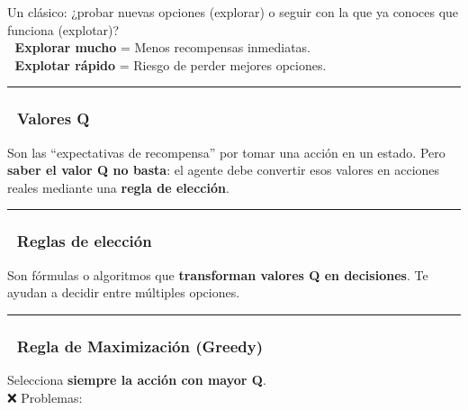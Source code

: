 \documentclass[
  letterpaper,
  DIV=11,
  numbers=noendperiod]{scrartcl}
\begin{document}
Un clásico: ¿probar nuevas opciones (explorar) o seguir con la que ya
conoces que funciona (explotar)?\\

🔹 \textbf{Explorar mucho} = Menos recompensas inmediatas.\\

🔹 \textbf{Explotar rápido} = Riesgo de perder mejores opciones.

\begin{center}\rule{0.5\linewidth}{0.5pt}\end{center}

\hypertarget{valores-q}{%
\subsubsection{\texorpdfstring{🧠 \textbf{Valores
Q}}{🧠 Valores Q}}\label{valores-q}}

Son las ``expectativas de recompensa'' por tomar una acción en un
estado. Pero \textbf{saber el valor Q no basta}: el agente debe
convertir esos valores en acciones reales mediante una \textbf{regla de
elección}.

\begin{center}\rule{0.5\linewidth}{0.5pt}\end{center}

\hypertarget{reglas-de-elecciuxf3n}{%
\subsubsection{\texorpdfstring{🎯 \textbf{Reglas de
elección}}{🎯 Reglas de elección}}\label{reglas-de-elecciuxf3n}}

Son fórmulas o algoritmos que \textbf{transforman valores Q en
decisiones}. Te ayudan a decidir entre múltiples opciones.

\begin{center}\rule{0.5\linewidth}{0.5pt}\end{center}

\hypertarget{regla-de-maximizaciuxf3n-greedy}{%
\subsubsection{\texorpdfstring{💎 \textbf{Regla de Maximización
(Greedy)}}{💎 Regla de Maximización (Greedy)}}\label{regla-de-maximizaciuxf3n-greedy}}

Selecciona \textbf{siempre la acción con mayor Q}.\\

❌ Problemas:
\end{document}
